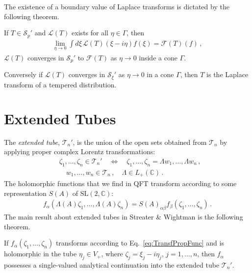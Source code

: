 The existence of a boundary value of Laplace transforms is dictated
by the following theorem. 
\begin{Thm}
    If $T\in\mathcal{S}_p'$ and $\mathcal{L}(T)$ exists for all $\eta\in\Gamma$, 
    then
    \begin{align}
        \label{eq:BoundaryValueThm}
        \lim_{\eta\to 0} \int d\xi\, \mathcal{L}(T)(\xi-i\eta) f(\xi) 
        = \mathcal{F}(T)(f)\, ,
    \end{align}
    \ie $\mathcal{L}(T)$ converges in $\mathcal{S}_p'$ to $\mathcal{F}(T)$ 
    as $\eta\to 0$ inside a cone $\Gamma$.

    Conversely if $\mathcal{L}(T)$ converges in $\mathcal{S}_\xi'$ as $\eta\to 0$
    in a cone $\Gamma$, then $T$ is the Laplace transform of a tempered distribution.
\end{Thm}

\section{Extended Tubes}
\label{sec:ExtTubes}

The {\em extended tube}, $\mathcal{T}_n'$, is the union of the open sets
obtained from $\mathcal{T}_n$ by applying proper complex Lorentz
transformations:
\begin{align}
    &\zeta_1, \ldots, \zeta_n \in \mathcal{T}_n' 
    \quad \Longleftrightarrow \quad
    \zeta_1, \ldots, \zeta_n = \Lambda w_1, \ldots, \Lambda w_n\, , \\
    &\quad w_1, \ldots, w_n \in \mathcal{T}_n\, ,  \quad
    \Lambda \in L_+(\mathbb{C})\, . \nonumber
\end{align}
The holomorphic functions that we find in QFT transform according to
some representation $S(A)$ of $\mathrm{SL}(2,\mathbb{C})$:
\begin{align}
    \label{eq:TransfPropFunc}
    f_\alpha(\Lambda(A)\zeta_1, \ldots, \Lambda(A)\zeta_n) =
    S(A)_{\alpha\beta} f_\beta(\zeta_1, \ldots, \zeta_n)\,.
\end{align}
The main result about extended tubes in Streater \& Wightman is the following
theorem.
\begin{Thm}
    If $f_\alpha(\zeta_1, \ldots, \zeta_n)$ transforms according to 
    Eq.~\eqref{eq:TransfPropFunc} and is holomorphic in the tube 
    $\eta_j \in V_+$, where $\zeta_j=\xi_j-i\eta_j$, $j=1, \ldots, n$, 
    then $f_\alpha$ possesses a single-valued analytical continuation
    into the extended tube $\mathcal{T}_n'$.
\end{Thm}

